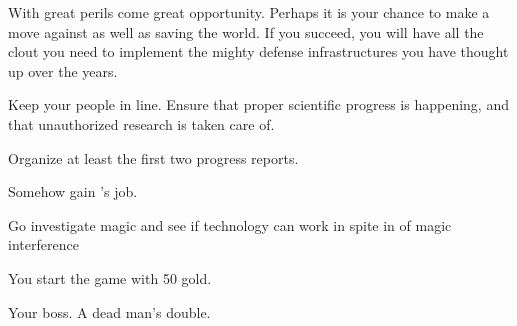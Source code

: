 \documentclass[char]{guildcamp3}
\begin{document}
With great perils come great opportunity. Perhaps it is your chance to make a move against \cPoliOne{} as well as saving the world. If you succeed, you will have all the clout you need to implement the mighty defense infrastructures you have thought up over the years.


\begin{itemz}[Goals]
  \item Keep your people in line. Ensure that proper scientific progress is happening, and that unauthorized research is taken care of.
  \item Organize at least the first two progress reports.
  \item Somehow gain \cPoliOne{}'s job.
  \item Go investigate magic and see if technology can work in spite in of magic interference
\end{itemz}

\begin{itemz}[Notes]
	\item You start the game with 50 gold. 
\end{itemz}

\begin{contacts}
  \contact{\cPoliOne{}} Your boss.
  \contact{\cRogueOne{}} A dead man's double.
\end{contacts}
\end{document}
